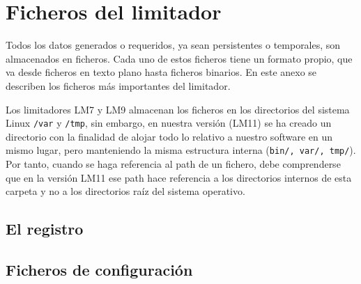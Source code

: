 \chapter{Ficheros del limitador} \label{append:ficheros}

Todos los datos generados o requeridos, ya sean persistentes o temporales, son almacenados en ficheros. Cada uno de estos ficheros tiene un formato propio, que va desde ficheros en texto plano hasta ficheros binarios. En este anexo se describen los ficheros más importantes del limitador.

Los limitadores LM7 y LM9 almacenan los ficheros en los directorios del sistema Linux \verb|/var| y \verb|/tmp|, sin embargo, en nuestra versión (LM11) se ha creado un directorio con la finalidad de alojar todo lo relativo a nuestro software en un mismo lugar, pero manteniendo la misma estructura interna (\verb|bin/, var/, tmp/|). Por tanto, cuando se haga referencia al path de un fichero, debe comprenderse que en la versión LM11 ese path hace referencia a los directorios internos de esta carpeta y no a los directorios raíz del sistema operativo.

\section{El registro}
\label{append:F_registro}

\clearpage

\section{Ficheros de configuración}
\label{append:F_configuracion}

\clearpage
